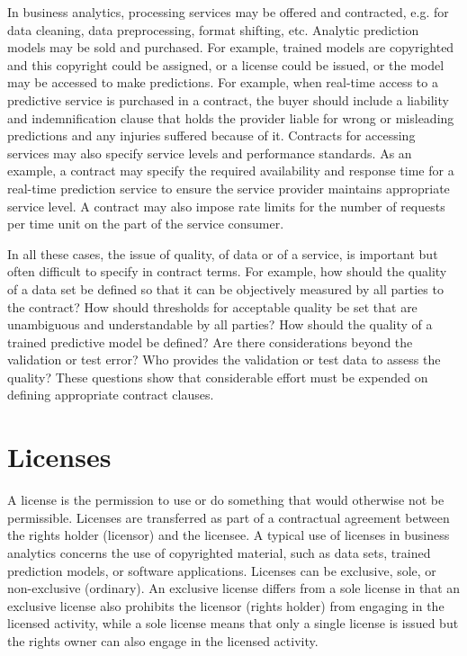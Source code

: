 In business analytics, processing services may be offered and contracted, e.g. for data cleaning, data preprocessing, format shifting, etc. Analytic prediction models may be sold and purchased. For example, trained models are copyrighted and this copyright could be assigned, or a license could be issued, or the model may be accessed to make predictions. For example, when real-time access to a predictive service is purchased in a contract, the buyer should include a liability and indemnification clause that holds the provider liable for wrong or misleading predictions and any injuries suffered because of it. Contracts for accessing services may also specify service levels and performance standards. As an example, a contract may specify the required availability and response time for a real-time prediction service to ensure the service provider maintains appropriate service level. A contract may also impose rate limits for the number of requests per time unit on the part of the service consumer.

In all these cases, the issue of quality, of data or of a service, is important but often difficult to specify in contract terms. For example, how should the quality of a data set be defined so that it can be objectively measured by all parties to the contract? How should thresholds for acceptable quality be set that are unambiguous and understandable by all parties? How should the quality of a trained predictive model be defined? Are there considerations beyond the validation or test error? Who provides the validation or test data to assess the quality? These questions show that considerable effort must be expended on defining appropriate contract clauses. 

\section{Licenses}

A license is the permission to use or do something that would otherwise not be permissible. Licenses are transferred as part of a contractual agreement between the rights holder (licensor) and the licensee. A typical use of licenses in business analytics concerns the use of copyrighted material, such as data sets, trained prediction models, or software applications. Licenses can be exclusive, sole, or non-exclusive (ordinary). An exclusive license differs from a sole license in that an exclusive license also prohibits the licensor (rights holder) from engaging in the licensed activity, while a sole license means that only a single license is issued but the rights owner can also engage in the licensed activity. 

